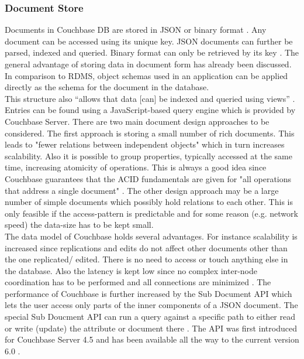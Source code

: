 \subsubsection{Document Store}
Documents in Couchbase DB are stored in JSON \parencite{objelean} or binary format \parencite{couchbaseDocuData}. Any document can be accessed using its unique key. JSON documents can further be parsed, indexed and queried. Binary format can only be retrieved by its key \parencite{couchbaseDocuData}. The general advantage of storing data in document form has already been discussed. In comparison to RDMS, object schemas used in an application can be applied directly as the schema for the document in the database.\\
This structure also “allows that data [can] be indexed and queried using views” \parencite{objelean}. Entries can be found using a JavaScript-based query engine which is provided by Couchbase Server. There are two main document design approaches to be considered. The first approach is storing a small number of rich documents. This leads to "fewer relations between independent objects" \parencite{couchbaseDocuDataModel} which in turn increases scalability. Also it is possible to group properties, typically accessed at the same time, increasing atomicity of operations. This is always a good idea since Couchbase guarantees that the ACID fundamentals are given for "all operations that address a single document" \parencite{couchbaseDocuDataModel}. The other design approach may be a large number of simple documents which possibly hold relations to each other. This is only feasible if the access-pattern is predictable and for some reason (e.g. network speed) the data-size has to be kept small. \\
The data model of Couchbase holds several advantages. For instance scalability is increased since replications and edits do not affect other documents other than the one replicated/ edited. There is no need to access or touch anything else in the database. Also the latency is kept low since no complex inter-node coordination has to be performed and all connections are minimized \parencite{couchbaseDocuDataModel}. The performance of Couchbase is further increased by the Sub Document API which lets the user access only parts of the inner components of a JSON document. The special Sub Doucment API can run a query against a specific path to either read or write (update) the attribute or document there \parencite{couchbaseDocuSubDoc}. The API was first introduced for Couchbase Server 4.5 and has been available all the way to the current version 6.0 \parencite{couchbaseDocuSubDoc}.
